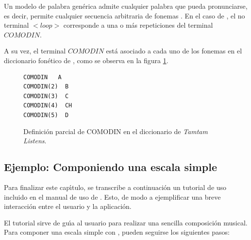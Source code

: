Un modelo de palabra gen\'erica admite cualquier palabra que pueda pronunciarse, es decir, permite
cualquier secuencia arbitraria de fonemas \cite{Bazzi00Modeling}. 
En el caso de , el no terminal $<loop>$ corresponde a una o m\'as repeticiones del
terminal $COMODIN$.

A su vez, el terminal $COMODIN$ est\'a asociado a cada uno de los fonemas en el diccionario fon\'etico de
, como se observa en la figura \ref{figure:fragmento-comodin}.

\begin{figure}[H]
\begin{lstlisting}
COMODIN   A
COMODIN(2)  B
COMODIN(3)  C
COMODIN(4)  CH
COMODIN(5)  D
\end{lstlisting}
\caption{Definici\'on parcial de COMODIN en el diccionario de \emph{Tamtam Listens}.}
\label{figure:fragmento-comodin}
\end{figure}


\subsection{Ejemplo: Componiendo una escala simple}
Para finalizar este cap{\'\i}tulo, se transcribe a continuaci\'on un tutorial de uso incluido en el manual
de uso de . Esto, de modo a ejemplificar una breve interacci\'on entre el usuario
y la aplicaci\'on.

El tutorial sirve de gu{\'\i}a al usuario para realizar una sencilla composici\'on musical.
Para componer una escala simple con , pueden seguirse los siguientes pasos:

